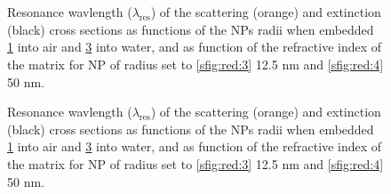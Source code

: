 


%
\begin{figure}[h!]
\def\svgwidth{\textwidth} \small
\hspace*{.75em}
\begin{subfigure}{.1\textwidth}\caption{ }\label{sfig:red:1}\end{subfigure}
\vspace*{12.5em} %
\\
\vspace*{-16.5em} %
\hspace*{0.5em}%
\begin{subfigure}{.1\textwidth}\caption{ }\label{sfig:red:2}\end{subfigure}\\
\vspace*{-2em} %
\caption[Spectral redshift of the scattering and extinciton of a spherical AuNP as function of its size and the embedding media]{Resonance wavlength ($\lambda_\text{res}$) of the scattering (orange) and extinction (black) cross sections as functions of the NPs radii when embedded  \ref{sfig:red:1} into air and \ref{sfig:red:2} into water, and as function of the refractive index of the matrix for NP of radius set to  \ref{sfig:red:3} 12.5 nm and \ref{sfig:red:4} 50 nm.}
\end{figure}


%
\begin{figure}[h!]\centering
	\def\svgwidth{.8\textwidth} \small
{}
\vspace*{-1em}
\caption[Spectral redshift of the scattering and extinciton of a spherical AuNP as function of its size and the embedding media]{Resonance wavlength ($\lambda_\text{res}$) of the scattering (orange) and extinction (black) cross sections as functions of the NPs radii when embedded  \ref{sfig:red:1} into air and \ref{sfig:red:2} into water, and as function of the refractive index of the matrix for NP of radius set to  \ref{sfig:red:3} 12.5 nm and \ref{sfig:red:4} 50 nm.}
\end{figure}


